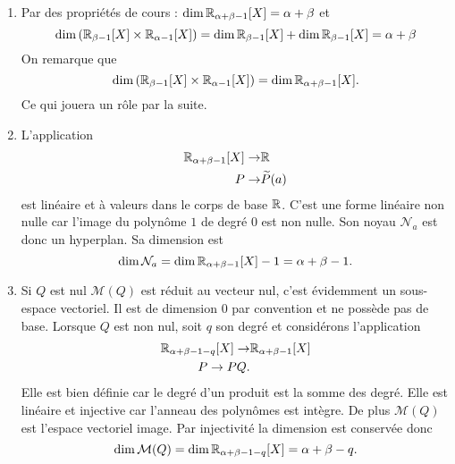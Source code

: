 \begin{enumerate}
 \item Par des propriétés de cours : $\dim \mathbb{R}_{\alpha +\beta-1}[X]=\alpha + \beta$ et 
\begin{displaymath}
 \dim \left( \mathbb{R}_{\beta-1}[X]\times \mathbb{R}_{\alpha-1}[X]\right) = \dim \mathbb{R}_{\beta-1}[X] + \dim \mathbb{R}_{\beta-1}[X]= \alpha + \beta
\end{displaymath}
On remarque que
\begin{displaymath}
 \dim \left( \mathbb{R}_{\beta-1}[X]\times \mathbb{R}_{\alpha-1}[X]\right) = \dim \mathbb{R}_{\alpha +\beta-1}[X].
\end{displaymath}
Ce qui jouera un rôle par la suite.
\item L'application
\begin{displaymath}
 \begin{aligned}
  \mathbb{R}_{\alpha +\beta-1}[X] \rightarrow& \mathbb{R} \\ 
 P \rightarrow& \widetilde{P}(a)
 \end{aligned}
\end{displaymath}
est linéaire et à valeurs dans le corps de base $\mathbb{R}$. C'est une forme linéaire non nulle car l'image du polynôme $1$ de degré $0$ est non nulle. Son noyau $\mathcal N_a$ est donc un hyperplan. Sa dimension est 
\begin{displaymath}
 \dim \mathcal N_a = \dim \mathbb{R}_{\alpha +\beta-1}[X] -1 =\alpha +\beta -1 .
\end{displaymath}
 
\item Si $Q$ est nul $\mathcal M(Q)$ est réduit au vecteur nul, c'est évidemment un sous-espace vectoriel. Il est de dimension $0$ par convention et ne possède pas de base. Lorsque $Q$ est non nul, soit $q$ son degré et considérons l'application
\begin{displaymath}
 \begin{aligned}
  \mathbb{R}_{\alpha + \beta-1 -q }[X] \rightarrow& \mathbb{R}_{\alpha +\beta-1}[X]\\
  P \rightarrow PQ.
 \end{aligned}
\end{displaymath}
Elle est bien définie car le degré d'un produit est la somme des degré. Elle est linéaire et injective car l'anneau des polynômes est intègre. De plus $\mathcal M(Q)$ est l'espace vectoriel image. Par injectivité la dimension est conservée donc 
\begin{displaymath}
 \dim \mathcal M(Q) = \dim \mathbb{R}_{\alpha + \beta-1 -q }[X] = \alpha + \beta -q.
\end{displaymath}


\end{enumerate}

